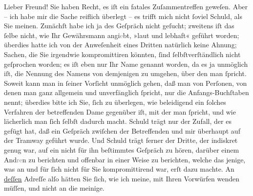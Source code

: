 \pstart\center{}Lieber Freund!\pend\vspace{0.5em}
\pstart
           Sie haben Recht, es iſt ein fatales Zuſammentreffen geweſen. Aber – ich habe mir die
               Sache reiflich überlegt – es trifft mich nicht{ }ſoviel Schuld, als Sie meinen.
               Zunächſt habe ich ja des Geſpräch nicht geſucht; zweitens iſt das{ }ſelbe nicht, wie
               Ihr Gewährsmann
                  angi\textcolor{gray}{e}bt, »laut und lebhaft« geführt worden; überdies hatte ich
               von der Anweſenheit eines Dritten natürlich keine Ahnung; Sachen, die Sie irgendwie kompromittiren
               könnten,{ }ſind{ }ſelbſtverſtändlich nicht geſprochen worden; es iſt eben nur Ihr Name
               genannt worden, da es ja unmöglich iſt, die Nennung des Namens von demjenigen zu
               umgehen, über den man{ }ſpricht. Soweit kann man in{ }ſeiner Vorſicht unmöglich gehen,
               daß man von Perſonen, von denen man ganz {\pb}allgemein
               und unverfänglich{ }ſpricht, nur die Anfangs-Buchſtaben nennt; überdies bitte ich Sie,{ }ſich zu überlegen, wie beleidigend ein{ }ſolches Verfahren der betreffenden Dame gegenüber iſt, mit der
               man{ }ſpricht, und wie lächerlich man{ }ſich{ }ſelbſt dadurch macht. Schuld trägt nur der
               Zufall, der es gefügt hat, daß ein Geſpräch zwiſchen der Betreffenden und mir überhaupt auf der
               Tramway geführt wurde. Und Schuld trägt ferner der Dritte, der indiskret genug war, auf ein
               nicht für ihn beſtimmtes Geſpräch zu hören, darüber einem And\textcolor{gray}{re}n
               zu berichten und offenbar in einer Weise zu berichten, welche das jenige, was an  und für{ }ſich nicht \introOben{}für Sie\introOben{}
               kompromittirend war, erſt dazu machte. An \uline{deſſen}
               Adreſſe alſo hätten Sie{ }ſich, wie ich meine, mit Ihren Vorwürfen wenden müſſen, und
               nicht an die meinige.\pend
           

